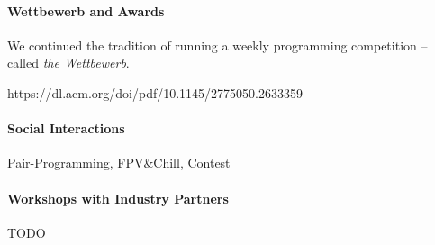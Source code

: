 \paragraph{Wettbewerb and Awards}
We continued the tradition of running a weekly
programming competition -- called \emph{the Wettbewerb}.


https://dl.acm.org/doi/pdf/10.1145/2775050.2633359

\paragraph{Social Interactions}
Pair-Programming, FPV\&Chill, Contest

\paragraph{Workshops with Industry Partners}
TODO

